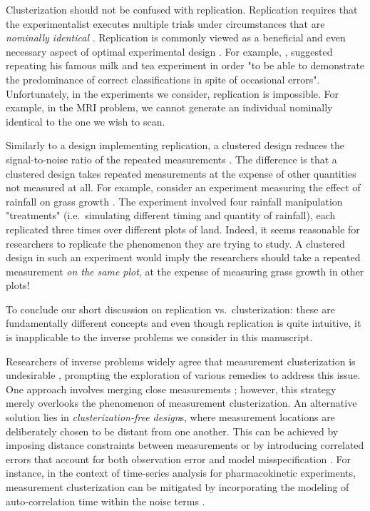 \documentclass[ba]{imsart}
\theoremstyle{plain}
\theoremstyle{definition}
\theoremstyle{remark}
\begin{document}
Clusterization should not be confused with replication. Replication
requires that the experimentalist executes multiple trials under
circumstances that are \emph{nominally identical} \cite[Section
  1.2.4]{morris2011}. Replication is commonly viewed as a beneficial
and even necessary aspect of optimal experimental design
\cite{fisher1949design, morris2011, schafer2001replication}.
For example, \cite{fisher1949design}, suggested repeating his famous
milk and tea experiment in order "to be able to demonstrate the
predominance of correct classifications in spite of occasional
errors". Unfortunately, in the experiments we consider, replication is
impossible. For example, in the MRI problem, we cannot generate an
individual nominally identical to the one we wish to scan.

Similarly to a design implementing replication, a clustered design
reduces the signal-to-noise ratio of the repeated measurements
\cite{telford2007brief}. The difference is that a clustered design
takes repeated measurements at the expense of other quantities not
measured at all. For example, consider an experiment measuring the
effect of rainfall on grass growth \cite{fay2000rainfall}. The
experiment involved four rainfall manipulation "treatments"
(i.e.~simulating different timing and quantity of rainfall), each
replicated three times over different plots of land. Indeed, it seems
reasonable for researchers to replicate the phenomenon they are trying
to study. A clustered design in such an experiment would imply the
researchers should take a repeated measurement \emph{on the same
plot}, at the expense of measuring grass growth in other plots!

To conclude our short discussion on replication vs.~clusterization:
these are fundamentally different concepts and even though replication
is quite intuitive, it is inapplicable to the inverse problems we
consider in this manuscript.

Researchers of inverse problems widely agree that measurement
clusterization is undesirable \cite{fedorov1996, nyberg2012,
  fedorov1997, Ucinski05, neitzel2019sparse}, prompting the
exploration of various remedies to address this issue. One approach
involves merging close measurements \cite{fedorov1997}; however, this
strategy merely overlooks the phenomenon of measurement
clusterization. An alternative solution lies in
\emph{clusterization-free design}s, where measurement locations are
deliberately chosen to be distant from one another. This can be
achieved by imposing distance constraints between measurements or by
introducing correlated errors that account for both observation error
and model misspecification \cite{Ucinski05}. For instance, in the
context of time-series analysis for pharmacokinetic experiments,
measurement clusterization can be mitigated by incorporating the
modeling of auto-correlation time within the noise terms
\cite{nyberg2012}.
\end{document}
